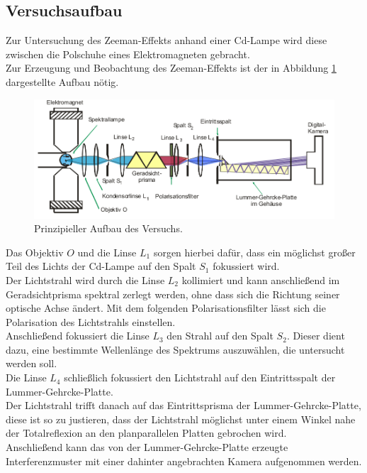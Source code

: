 \subsection{Versuchsaufbau}
\label{sec:Versuchsaufbau}
Zur Untersuchung des Zeeman-Effekts anhand einer Cd-Lampe wird
diese zwischen die Polschuhe eines Elektromagneten gebracht.\\
Zur Erzeugung und Beobachtung des Zeeman-Effekts ist der in Abbildung \ref{fig:aufbau} dargestellte Aufbau nötig.

\begin{figure}
  \centering
  \includegraphics[width=0.98\columnwidth]{pictures/aufbau.png}
  \caption{Prinzipieller Aufbau des Versuchs.\cite{Anleitung}}
  \label{fig:aufbau}
\end{figure}
Das Objektiv $O$ und die Linse $L_1$ sorgen hierbei dafür, dass ein möglichst großer Teil des Lichts der Cd-Lampe auf den Spalt $S_1$ fokussiert wird.\\
Der Lichtstrahl wird durch die Linse $L_2$ kollimiert und kann anschließend im Geradsichtprisma spektral zerlegt werden, ohne dass sich die Richtung seiner optische Achse ändert.
Mit dem folgenden Polarisationsfilter lässt sich die Polarisation des Lichtstrahls einstellen. \\
Anschließend fokussiert die Linse $L_3$ den Strahl auf den Spalt $S_2$. Dieser dient dazu, eine bestimmte Wellenlänge des Spektrums auszuwählen, die untersucht werden soll.\\ Die Linse $L_4$ schließlich fokussiert den Lichtstrahl auf den Eintrittsspalt der Lummer-Gehrcke-Platte.\\
Der Lichtstrahl trifft danach auf das Eintrittsprisma der Lummer-Gehrcke-Platte, diese ist so zu justieren, dass der Lichtstrahl möglichst unter einem Winkel nahe der Totalreflexion an den planparallelen Platten gebrochen wird. \\
Anschließend kann
das von der Lummer-Gehrcke-Platte erzeugte
Interferenzmuster mit einer dahinter angebrachten Kamera aufgenommen werden.
